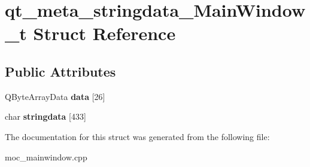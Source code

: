 \hypertarget{structqt__meta__stringdata__MainWindow__t}{\section{qt\-\_\-meta\-\_\-stringdata\-\_\-\-Main\-Window\-\_\-t Struct Reference}
\label{structqt__meta__stringdata__MainWindow__t}
}
\subsection*{Public Attributes}
\begin{DoxyCompactItemize}
\item 
\hypertarget{structqt__meta__stringdata__MainWindow__t_a48f255bc47fc5d9f118e582b8447d10a}{Q\-Byte\-Array\-Data {\bfseries data} \mbox{[}26\mbox{]}}\label{structqt__meta__stringdata__MainWindow__t_a48f255bc47fc5d9f118e582b8447d10a}

\item 
\hypertarget{structqt__meta__stringdata__MainWindow__t_a4d2ffaca60ebcd18eb1da6584b809066}{char {\bfseries stringdata} \mbox{[}433\mbox{]}}\label{structqt__meta__stringdata__MainWindow__t_a4d2ffaca60ebcd18eb1da6584b809066}

\end{DoxyCompactItemize}


The documentation for this struct was generated from the following file\-:\begin{DoxyCompactItemize}
\item 
moc\-\_\-mainwindow.\-cpp\end{DoxyCompactItemize}
